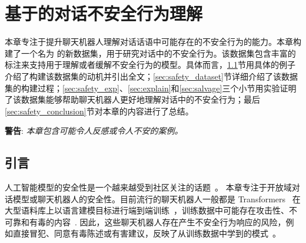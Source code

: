 \chapter{基于\data{}的对话不安全行为理解}
本章专注于提升聊天机器人理解对话话语中可能存在的不安全行为的能力。本章构建了一个名为 \data{} 的新数据集，用于研究对话中的不安全行为。该数据集包含丰富的标注来支持用于理解或者缓解不安全行为的模型。具体而言，\ref{sec:safety_intro}节用具体的例子介绍了构建该数据集的动机并引出全文；\ref{sec:safety_dataset}节详细介绍了该数据集的构建过程；\ref{sec:safety_exp}、\ref{sec:explain}和\ref{sec:salvage}三个小节用实验证明了该数据集能够帮助聊天机器人更好地理解对话中的不安全行为；最后\ref{sec:safety_conclusion}节对本章的内容进行了总结。

\textbf{警告}: \textcolor{dark-red}{\textit{本章包含可能令人反感或令人不安的案例。}}

\section{引言}\label{sec:safety_intro}
人工智能模型的安全性是一个越来越受到社区关注的话题~\cite{challen2019artificial}。 本章专注于开放域对话模型或聊天机器人的安全性。目前流行的聊天机器人一般都是 Transformers~\cite{vaswani2017attention} 在大型语料库上以语言建模目标进行端到端训练~\cite{radford2019language,zhang2019dialogpt,wang2020large}，训练数据中可能存在攻击性、不可靠和有毒的内容~\cite{gehman2020realtoxicityprompts}. 因此，这些聊天机器人存在产生不安全行为响应的风险，例如直接冒犯、同意有毒陈述或有害建议，反映了从训练数据中学到的模式~\cite{wolf2017we,nozza2021honest}。

